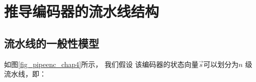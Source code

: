 %
%
%
%
%
%
%
%
%
%


\section{推导编码器的流水线结构}\label{sec_pipeinfer_chap4}

\subsection{流水线的一般性模型}
如图\ref{fig_pipeenc_chap4}所示，
我们假设
该编码器的状态向量$\vec{s}$可以划分为$n$ 级流水线，即：

